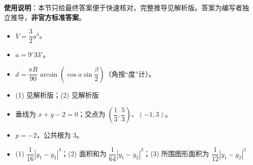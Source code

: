 
\begin{gknotice}
\textbf{使用说明}：本节只给最终答案便于快速核对，完整推导见解析版。答案为编写者独立推导，\textbf{非官方标准答案}。
\end{gknotice}

\begin{itemize}[leftmargin=2.6em]
  \item[\textbf{1.}] $V=\dfrac32a^3$。
  \item[\textbf{2.}] $a=9^\circ33'$。
  \item[\textbf{3.}] $d=\dfrac{\pi R}{90}\arcsin\left(\cos a\sin\dfrac\beta2\right)$（角按“度”计）。
  \item[\textbf{4.}] (1) 见解析版；(2) 见解析版
\end{itemize}

\begin{itemize}[leftmargin=2.6em]
  \item[\textbf{5.}] 垂线为 $x+y-2=0$；交点为 $\left(\dfrac13,\dfrac53\right)$、$(-1,3)$。
  \item[\textbf{6.}] $p=-2$，公共根为 $3$。
  \item[\textbf{7.}] (1) $\dfrac1{16}|y_1-y_2|^3$；(2) 面积和为 $\dfrac1{64}|y_1-y_2|^3$；(3) 所围图形面积为 $\dfrac1{12}|y_1-y_2|^3$
\end{itemize}
